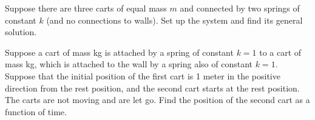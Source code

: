 \begin{exercise}
Suppose there are three carts of equal mass $m$ and connected by two springs of
constant $k$ (and no connections to walls).  Set up the system and find its
general solution.
\end{exercise}

\begin{exercise}
Suppose a cart of mass \unit[2]{kg} is attached by a spring of
constant $k=1$ to a cart of mass \unit[3]{kg}, which
is attached to the wall by a spring also of constant $k=1$.
Suppose that the initial position of the first cart is 1 meter in the
positive direction from the rest position, and the second cart starts at the
rest position.  The carts are not moving and are let go.  Find the
position of the second cart as a function of time.
\end{exercise}

